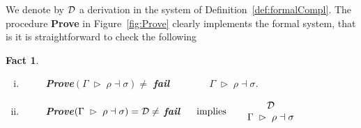 \documentclass[UKenglish]{eptcs}
\newtheorem{fact}[definition]{Fact}
\newcommand{\comply}{\dashv}
\newcommand{\complyF}{\comply}\newcommand{\altcomplyR}{\comply^{\mbox{\tiny $\blacktriangle$}}_{\mathsf a}}
\newcommand{\der}{\;\vartriangleright\;}
\newcommand{\Iff}{\text { iff }}
\renewcommand{\implies}{\text{ implies }}
\newcommand{\Prove}{\textbf{Prove}}
\newcommand{\FAIL}{\textbf{fail}}
\begin{document}
We denote by ${\cal D}$ a derivation in the system of Definition~\ref{def:formalCompl}.
The procedure \Prove\; in Figure~\ref{fig:Prove} clearly implements the formal system,
that is it is straightforward to check the following
\begin{fact}\label{fact:provecorr}\hfill
\begin{enumerate}[i)]
\item\vspace{-2mm}~~~~
{\em \Prove}$(\Gamma\der \rho\complyF\sigma)\neq$ {\em \FAIL}~~~~\Iff~~~~$\Gamma\der \rho\complyF\sigma$.
\item\vspace{-3mm}~~~~
{\em \Prove}$(\Gamma\der \rho\complyF\sigma)={\cal D}\neq$ {\em \FAIL}$~~~~\implies~~~~\begin{array}{c}{\cal D}\\ \Gamma\der \rho\complyF\sigma\end{array}$
\end{enumerate}
\end{fact}
\end{document}

